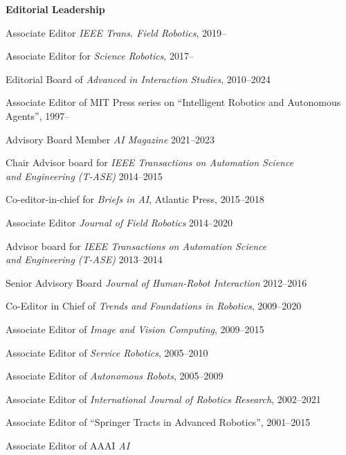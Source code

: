 \documentclass{article}
\begin{document}
\begin{cv}
	\begin{cvlist} {\bf Editorial Leadership}
		\item Associate Editor {\em IEEE Trans.\/ Field Robotics}, \cftdotfill{\cftdotsep} 2019--
		\item Associate Editor for {\em Science Robotics}, \cftdotfill{\cftdotsep} 2017--
		\item Editorial Board of {\em Advanced in Interaction
				Studies},\cftdotfill{\cftdotsep} 2010--2024
		\item Associate Editor of MIT Press series on ``Intelligent Robotics
		and Autonomous\\ Agents'',\cftdotfill{\cftdotsep} 1997--
		\item Advisory Board Member {\em AI Magazine}\@ \cftdotfill{\cftdotsep} 2021--2023
		\item Chair Advisor board for {\em IEEE Transactions on Automation
				Science\\ and Engineering (T-ASE)}  \cftdotfill{\cftdotsep} 2014--2015
		\item Co-editor-in-chief for {\em Briefs in AI}, Atlantic Press,
		\cftdotfill{\cftdotsep}  2015--2018
		\item Associate Editor {\em Journal of Field Robotics}
		\cftdotfill{\cftdotsep} 2014--2020
		\item Advisor board for {\em IEEE Transactions on Automation
				Science\\ and Engineering (T-ASE)} \cftdotfill{\cftdotsep} 2013--2014
		\item Senior Advisory Board {\em Journal of Human-Robot Interaction}
		\cftdotfill{\cftdotsep} 2012--2016
		\item Co-Editor in Chief of {\em Trends and Foundations in
				Robotics}, \cftdotfill{\cftdotsep} 2009--2020
		\item Associate Editor of {\em Image and Vision
				Computing},\cftdotfill{\cftdotsep} 2009--2015
		\item Associate Editor of {\em Service Robotics},
		\cftdotfill{\cftdotsep} 2005--2010
		\item Associate Editor of {\em Autonomous Robots},
		\cftdotfill{\cftdotsep} 2005--2009
		\item Associate Editor of {\em International Journal of Robotics
				Research},\cftdotfill{\cftdotsep} 2002--2021
		\item Associate Editor of ``Springer Tracts in Advanced
		Robotics'',\cftdotfill{\cftdotsep} 2001--2015
		\item Associate Editor of AAAI {\em AI
}
\end{cvlist}
\end{cv}
\end{document}
